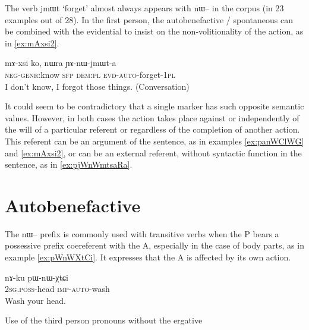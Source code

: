 \documentclass[oldfontcommands,oneside,a4paper,11pt]{article}
\newcommand{\ipa}[1]{{\phon \mbox{#1}}} %
\begin{document}
The verb \ipa{jmɯt} `forget' almost always appears with \ipa{nɯ--} in the corpus (in 23 examples out of 28). In the first person, the autobenefactive / spontaneous can be combined with the evidential to insist on the non-volitionality of the action, as in  \ref{ex:mAxsi2}.

\begin{exe}
 \ex \label{ex:mAxsi2}
 \gll
\ipa{mɤ-xsi}  	\ipa{ko,}  	\ipa{nɯra}  	\ipa{ɲɤ-nɯ-jmɯt-a}  \\
\textsc{neg-genr}:know \textsc{sfp} \textsc{dem:pl} \textsc{evd-auto}-forget-\textsc{1pl} \\
\glt I don't know, I forgot those things. (Conversation)
\end{exe}

It could seem to be contradictory that a single marker has such opposite semantic values. However, in both cases the action takes place against or independently of the will of a particular referent or regardless of the completion of another action. This referent can be an argument of the sentence, as in examples \ref{ex:panWClWG} and \ref{ex:mAxsi2}, or can be an external referent, without syntactic function in the sentence, as in \ref{ex:pjWnWmtsaRa}. 





 
\section{Autobenefactive}

The \ipa{nɯ--} prefix is commonly used with transitive verbs when the P bears a possessive prefix coereferent with the A, especially in the case of body parts, as in example \ref{ex:pWnWXtCi}. It expresses that the A is affected by its own action.

\begin{exe}
\ex \label{ex:pWnWXtCi}
\gll 
\ipa{nɤ-ku} 	\ipa{pɯ-nɯ-χtɕi} \\
\textsc{2sg.poss}-head \textsc{imp-auto}-wash \\
\glt Wash your head.
\end{exe}

Use of the third person pronouns without the ergative
\end{document}
